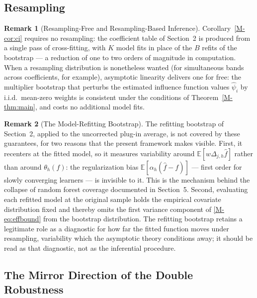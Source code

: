 \documentclass[12pt,a4paper]{article}
\numberwithin{equation}{section}
\theoremstyle{plain}
\theoremstyle{definition}
\newtheorem{remark}{Remark}
\newcommand{\E}{\mathbb{E}}
\newcommand{\Dh}{\Delta_{j,h}}
\begin{document}
	\subsection{Resampling}

	\begin{remark}[Resampling-Free and Resampling-Based Inference]
		\label{rem:bootstrap}
		Corollary~\ref{M-cor:ci} requires no resampling: the coefficient table of
		Section~2 is produced from a single pass of cross-fitting, with $K$ model fits
		in place of the $B$ refits of the bootstrap --- a reduction of one to two orders
		of magnitude in computation. When a resampling distribution is nonetheless
		wanted (for simultaneous bands across coefficients, for example), asymptotic
		linearity delivers one for free: the multiplier bootstrap that perturbs the
		estimated influence function values $\hat{\psi}_i$ by i.i.d.\ mean-zero
		weights is consistent \citep[Chapter~3.6]{vandervaart1996weak} under the
		conditions of Theorem~\ref{M-thm:main}, and costs no additional model fits.
	\end{remark}
	
	\begin{remark}[The Model-Refitting Bootstrap]
		\label{rem:refit}
		The refitting bootstrap of Section~2, applied to the uncorrected plug-in
		average, is not covered by these guarantees, for two reasons that the present
		framework makes visible. First, it recenters at the fitted model, so it
		measures variability around $\E[w \Dh \hat{f}]$ rather than around
		$\theta_h(f)$: the regularization bias
		$\E[\alpha_h (\hat{f} - f)]$ --- first order for slowly converging learners
		--- is invisible to it. This is the mechanism behind the collapse of random
		forest coverage documented in Section~5. Second, evaluating each refitted model
		at the original sample holds the empirical covariate distribution fixed and
		thereby omits the first variance component of \eqref{M-eq:effbound} from the
		bootstrap distribution. The refitting bootstrap retains a legitimate role as a diagnostic for how far the fitted function moves under resampling, variability which the asymptotic theory conditions away; it should be read as that diagnostic,
		not as the inferential procedure.
	\end{remark}

	\subsection{The Mirror Direction of the Double Robustness}
\end{document}
